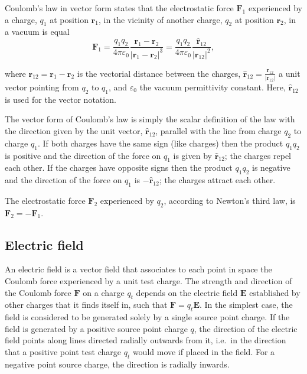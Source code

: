 \documentclass[
  english,
  9pt,
]{extbook}
\theoremstyle{definition}
\theoremstyle{definition}
\theoremstyle{definition}
\theoremstyle{definition}
\theoremstyle{remark}
\begin{document}
Coulomb's law in vector form states that the electrostatic force \({\textstyle \mathbf {F}_{1}}\) experienced by a charge, \(q_{1}\) at position \(\mathbf {r}_{1}\), in the vicinity of another charge, \(q_{2}\) at position \(\mathbf {r}_{2}\), in a vacuum is equal
\begin{equation}
{\displaystyle \mathbf{F}_{1}={\frac {q_{1}q_{2}}{4\pi \varepsilon _{0}}}{\frac {\mathbf{r}_{1}-\mathbf{r}_{2}}{|\mathbf {r}_{1}-\mathbf{r}_{2}|^{3}}}={\frac {q_{1}q_{2}}{4\pi \varepsilon_{0}}}{\frac{\mathbf{\hat{r}} _{12}}{|\mathbf {r} _{12}|^{2}}}},
\label{eq:coulomb2}
\end{equation}

where \({\textstyle {\boldsymbol {r}}_{12}={\boldsymbol {r}}_{1}-{\boldsymbol {r}}_{2}}\) is the vectorial distance between the charges, \({\textstyle {\widehat {\mathbf {r} }}_{12}={\frac {\mathbf {r} _{12}}{|\mathbf {r} _{12}|}}}\) a unit vector pointing from \({\textstyle q_{2}}\) to \({\textstyle q_{1}}\), and \(\varepsilon_{0}\) the vacuum permittivity constant. Here, \({\textstyle \mathbf {\hat {r}} _{12}}\) is used for the vector notation.

The vector form of Coulomb's law is simply the scalar definition of the law with the direction given by the unit vector, \({\textstyle {\widehat {\mathbf {r} }}_{12}}\), parallel with the line from charge \(q_{2}\) to charge \(q_{1}\). If both charges have the same sign (like charges) then the product \(q_1q_2\) is positive and the direction of the force on \(q_{1}\) is given by \({\textstyle {\widehat {\mathbf {r} }}_{12}}\); the charges repel each other. If the charges have opposite signs then the product \(q_1q_2\) is negative and the direction of the force on \(q_{1}\) is \({\textstyle -{\hat {\mathbf {r} }}_{12}}\); the charges attract each other.

The electrostatic force \({\textstyle \mathbf {F} _{2}}\) experienced by \(q_{2}\), according to Newton's third law, is \({\textstyle \mathbf {F} _{2}=-\mathbf {F} _{1}}\).

\subsection{Electric field}\label{electric-field}

An electric field is a vector field that associates to each point in space the Coulomb force experienced by a unit test charge. The strength and direction of the Coulomb force \({\textstyle \mathbf {F} }\) on a charge
\({\textstyle q_{t}}\) depends on the electric field \({\textstyle \mathbf {E} }\) established by other charges that it finds itself in, such that
\({\textstyle \mathbf {F} =q_{t}\mathbf {E} }\). In the simplest case, the field is considered to be generated solely by a single source point charge. If the field is generated by a positive source point charge \({\textstyle q}\), the direction of the electric field points along lines directed radially outwards from it, i.e.~in the direction that a positive point test charge \({\textstyle q_{t}}\) would move if placed in the field. For a negative point source charge, the direction is radially inwards.
\end{document}
